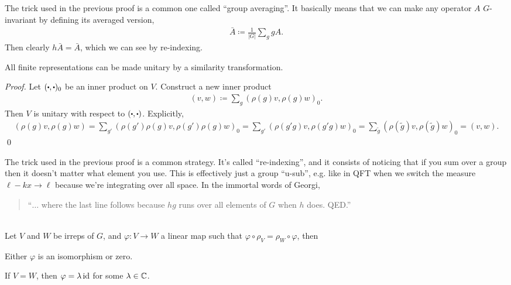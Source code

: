 \documentclass[11pt]{article}
\begin{document}
\begin{nnote}
    The trick used in the previous proof is a common one called
    ``group averaging''. It basically means that we can make any
    operator $A$ $G$-invariant by defining its averaged version,
    \begin{align*}
        \bar{A} \coloneqq \frac{1}{|G|} \sum_g g A.
    \end{align*}
    Then clearly $h\bar{A} = \bar{A}$, which we can see by re-indexing.
\end{nnote}

\begin{theorem}
    All finite representations can be made unitary by a similarity transformation.
\end{theorem}

\begin{proof}
    Let $(\sbullet, \sbullet)_0$ be an inner product on $V$. Construct a new inner product
    \begin{align*}
        (v, w) \coloneqq \sum_g (\rho(g)v, \rho(g)w)_0.
    \end{align*}
    Then $V$ is unitary with respect to $(\sbullet, \sbullet)$. Explicitly,
    \begin{align*}
        (\rho(g)v, \rho(g)w) = \sum_{g'} (\rho(g')\rho(g)v, \rho(g')\rho(g)w)_0
        = \sum_{g'} (\rho(g'g)v, \rho(g'g)w)_0 = \sum_{\tilde{g}} (\rho(\tilde{g})v, \rho(\tilde{g})w)_0 = (v, w).
    \end{align*}
    \qed
\end{proof}

\begin{nnote}
    The trick used in the previous proof is a common strategy.
    It's called ``re-indexing'', and it consists of
    noticing that if you sum over a group then it doesn't matter what 
    element you use. This is effectively just a group ``u-sub'', e.g. like
    in QFT when we switch the measure $\ell - kx \to \ell$ because we're integrating
    over all space. In the immortal words of Georgi,
    \begin{quote}
        ``$\ldots$ where the last line follows because $hg$ runs over all
        elements of $G$ when $h$ does. QED.''
    \end{quote}
\end{nnote}

\begin{theorem}{}\\
    Let $V$ and $W$ be irreps of $G$, and $\varphi \colon V \to W$
    a linear map such that $ \varphi \circ \rho_V = \rho_W \circ \varphi$, 
    then
    \begin{alphamerate}
        \item Either $\varphi$ is an isomorphism or zero.
        \item If $V = W$, then $\varphi = \lambda \operatorname{id}$ for some $\lambda \in \mathbb{C}$.
    \end{alphamerate}
\end{theorem}
\end{document}
